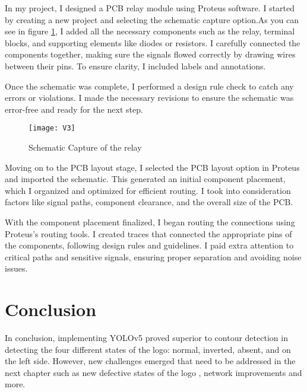 In my project, I designed a PCB relay module using Proteus software. I started by creating a new project and selecting the schematic capture option.As you can see in figure \ref{Schematic Capture of the relay}, I added all the necessary components such as the relay, terminal blocks, and supporting elements like diodes or resistors. I carefully connected the components together, making sure the signals flowed correctly by drawing wires between their pins. To ensure clarity, I included labels and annotations.

Once the schematic was complete, I performed a design rule check to catch any errors or violations. I made the necessary revisions to ensure the schematic was error-free and ready for the next step.


\FloatBarrier
\FloatBarrier
\begin{figure}[h]
\FloatBarrier
         \centering
        \texttt{[image: V3]}
   
        \caption{Schematic Capture of the relay}
        \label{Schematic Capture of the relay}
\FloatBarrier
    \end{figure}
\FloatBarrier
Moving on to the PCB layout stage, I selected the PCB layout option in Proteus and imported the schematic. This generated an initial component placement, which I organized and optimized for efficient routing. I took into consideration factors like signal paths, component clearance, and the overall size of the PCB.

With the component placement finalized, I began routing the connections using Proteus's routing tools. I created traces that connected the appropriate pins of the components, following design rules and guidelines. I paid extra attention to critical paths and sensitive signals, ensuring proper separation and avoiding noise issues.

\section{Conclusion}
In conclusion, implementing YOLOv5 proved superior to contour detection in detecting the four different states of the logo: normal, inverted, absent, and on the left side. However, new challenges emerged that need to be addressed in the next chapter such as new defective states of the logo , network improvements and more.
%




%